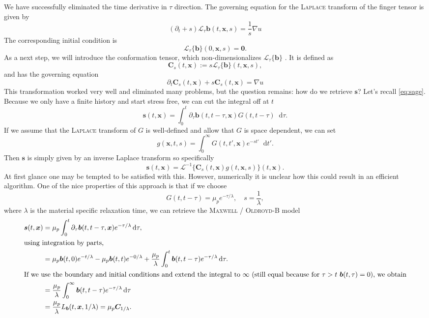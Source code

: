 \documentclass[12pt,a4paper,twoside, open=right]{scrreprt}
\theoremstyle{definition}
\theoremstyle{plain}
\newcommand{\bfb}{\bm{b}}
\newcommand{\bfs}{\bm{s}}
\newcommand{\bfC}{\bm{C}}
\newcommand{\bfx}{\bm{x}}
\newcommand{\D}{\mathop{}\!\mathrm{d}}
\begin{document}
We have successfully eliminated the time derivative in $\tau$ direction. The governing equation for the \textsc{Laplace} transform of the finger tensor is given by
\begin{equation}
(\partial_t +s)\mathcal{L}_\tau{\bfb}(t,\bfx,s) = \frac{1}{s}\nabla u
\end{equation}
The corresponding initial condition is 
\begin{equation}
   \mathcal{L}_\tau\{\bfb\}(0,\bfx,s) = \bm{0}.
\end{equation} 
As a next step, we will introduce the conformation tensor, which non-dimensionalizes $\mathcal{L}_\tau\{\bfb\}$ . It is defined as 
\begin{equation}
    \bfC_s(t,\bfx) := s\mathcal{L}_\tau\{\bfb\}(t,\bfx,s),
\end{equation}
and has the governing equation
\begin{equation}
    \partial_t\bfC_s(t,\bfx)+s\bfC_s(t,\bfx) =\nabla u
\end{equation}
This transformation worked very well and eliminated many problems, but the question remains: how do we retrieve $\bfs$?
Let's recall \eqref{eq:sage}.
Because we only have a finite history and start stress free, we can cut the integral off at $t$
\begin{equation}
    \bfs(t,\bfx)=\int_0^t\partial_\tau\bfb(t,t-\tau,\bfx)G(t,t-\tau)\D\tau.\label{eq:sagered}
\end{equation}
If we assume that the \textsc{Laplace} transform of $G$ is well-defined and allow that $G$ is space dependent, we can set
\begin{equation}
    g(\bfx,t,s) =\int_0^\infty G(t,t',\bfx)e^{-st'}\D t'.
\end{equation}
Then $\bfs$ is simply given by an inverse Laplace transform so specifically
\begin{equation}
    \bfs(t,\bfx) =\mathcal{L}^{-1}\{\bfC_s(t,\bfx)g(t,\bfx,s)\}(t,\bfx).
\end{equation}
At first glance one may be tempted to be satisfied with this. However, numerically it is unclear how this could result in an efficient algorithm. One of the nice properties of this approach is that if we choose 
\begin{equation}
    G(t,t-\tau)= \mu_p e^{-\tau/\lambda},\quad s=\frac{1}{\lambda},
\end{equation}
where $\lambda$ is the material specific relaxation time, we can retrieve the \textsc{Maxwell} / \textsc{Oldroyd}-B model 
\begin{align}
    \bfs(t,\bfx)&=\mu_p\int_0^t\partial_\tau\bfb(t,t-\tau,\bfx)e^{-\tau/\lambda}\D\tau,\\
    \intertext{using integration by parts,}
    &=\mu_p\bfb(t,0)e^{-t/\lambda}-\mu_p\bfb(t,t)e^{-0/\lambda}+\frac{\mu_p}{\lambda}\int_0^t\bfb(t,t-\tau)e^{-\tau/\lambda}\D\tau.\\
    \intertext{If we use the boundary and initial conditions and extend the integral to $\infty$ (still equal because for $\tau>t$ $\bfb(t,\tau)=0$), we obtain}
    &=\frac{\mu_p}{\lambda}\int_0^\infty\bfb(t,t-\tau)e^{-\tau/\lambda}\D\tau\\
    &=\frac{\mu_p}{\lambda}L_{\bfb}(t,\bfx,1/\lambda) = \mu_p\bfC_{1/\lambda}.
\end{align}
\end{document}
